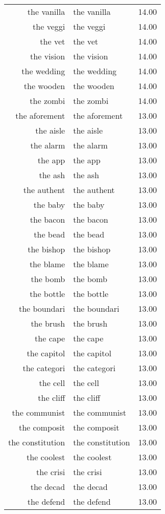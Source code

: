 \begin{table}[ht]
\begin{tabular}{rlr}
  the vanilla & the vanilla & 14.00 \\ 
  the veggi & the veggi & 14.00 \\ 
  the vet & the vet & 14.00 \\ 
  the vision & the vision & 14.00 \\ 
  the wedding & the wedding & 14.00 \\ 
  the wooden & the wooden & 14.00 \\ 
  the zombi & the zombi & 14.00 \\ 
  the aforement & the aforement & 13.00 \\ 
  the aisle & the aisle & 13.00 \\ 
  the alarm & the alarm & 13.00 \\ 
  the app & the app & 13.00 \\ 
  the ash & the ash & 13.00 \\ 
  the authent & the authent & 13.00 \\ 
  the baby & the baby & 13.00 \\ 
  the bacon & the bacon & 13.00 \\ 
  the bead & the bead & 13.00 \\ 
  the bishop & the bishop & 13.00 \\ 
  the blame & the blame & 13.00 \\ 
  the bomb & the bomb & 13.00 \\ 
  the bottle & the bottle & 13.00 \\ 
  the boundari & the boundari & 13.00 \\ 
  the brush & the brush & 13.00 \\ 
  the cape & the cape & 13.00 \\ 
  the capitol & the capitol & 13.00 \\ 
  the categori & the categori & 13.00 \\ 
  the cell & the cell & 13.00 \\ 
  the cliff & the cliff & 13.00 \\ 
  the communist & the communist & 13.00 \\ 
  the composit & the composit & 13.00 \\ 
  the constitution & the constitution & 13.00 \\ 
  the coolest & the coolest & 13.00 \\ 
  the crisi & the crisi & 13.00 \\ 
  the decad & the decad & 13.00 \\ 
  the defend & the defend & 13.00 \\ 

\end{tabular}
\end{table}

